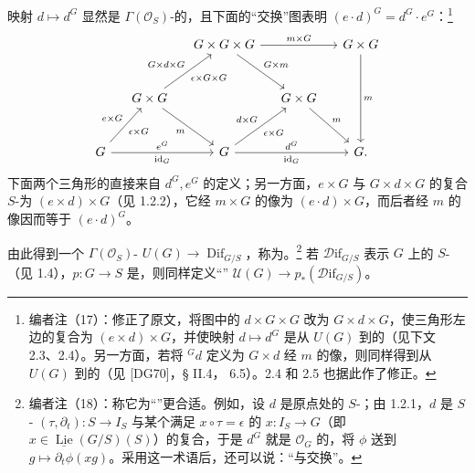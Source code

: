 映射 $d\mapsto d^G$ 显然是 $\Gamma(\mathcal O_S)$-的，且下面的“交换”图表明 $(e\cdot d)^G=d^G\cdot e^G$：\footnote{编者注（17）：修正了原文，将图中的 $d\times G\times G$ 改为 $G\times d\times G$，使三角形左边的复合为 $(e\times d)\times G$，并使映射 $d\mapsto d^G$ 是从 $U(G)$ 到的（见下文 2.3、2.4）。另一方面，若将 ${}^Gd$ 定义为 $G\times d$ 经 $m$ 的像，则同样得到从 $U(G)$ 到的（见 [DG70]，§ II.4， 6.5）。2.4 和 2.5 也据此作了修正。}
\[
\begin{tikzcd}[column sep=small,row sep=large]
&&G\times G\times G\arrow[rr,"m\times G"]\arrow[dr,"G\times m"]&&G\times G\arrow[dd,"m"]\\
&G\times G\arrow[ur,"G\times d\times G","\epsilon\times G\times G"']\arrow[dr,"m"']&&G\times G\arrow[dr,"m"]&\\
G\arrow[ur,"e\times G","\epsilon\times G"']\arrow[rr,"e^G","\operatorname{id}_G"']&&G\arrow[ur,"d\times G","\epsilon\times G"']\arrow[rr,"d^G","\operatorname{id}_G"']&&G.
\end{tikzcd}
\]
下面两个三角形的直接来自 $d^G,e^G$ 的定义；另一方面，$e\times G$ 与 $G\times d\times G$ 的复合 $S$-为 $(e\times d)\times G$（见 1.2.2），它经 $m\times G$ 的像为 $(e\cdot d)\times G$，而后者经 $m$ 的像因而等于 $(e\cdot d)^G$。

由此得到一个 $\Gamma(\mathcal O_S)$- $U(G)\to\operatorname{Dif}_{G/S}$，称为。\footnote{编者注（18）：称它为“”更合适。例如，设 $d$ 是原点处的 $S$-；由 1.2.1，$d$ 是 $S$- $(\tau,\partial_t):S\to I_S$ 与某个满足 $x\circ\tau=\epsilon$ 的 $x:I_S\to G$（即 $x\in\underline{\operatorname{Lie}}(G/S)(S)$）的复合，于是 $d^G$ 就是 $\mathcal O_G$ 的，将 $\phi$ 送到 $g\mapsto\partial_t\phi(xg)$。采用这一术语后，还可以说：“与交换”。}
若 $\mathscr{D}\mathrm{if}_{G/S}$ 表示 $G$ 上的 $S$-（见 1.4），$p:G\to S$ 是，则同样定义“”
$\mathcal U(G)\to p_*(\mathscr{D}\mathrm{if}_{G/S})$。

